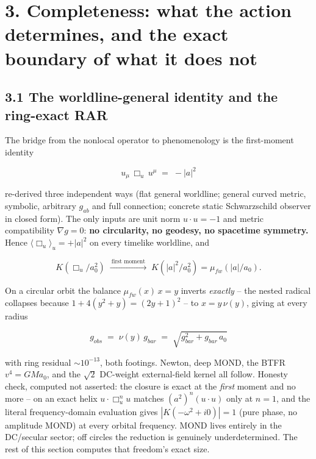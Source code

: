 \documentclass[
]{article}
\begin{document}
\section{3. Completeness: what the action determines, and the exact
boundary of what it does
not}\label{completeness-what-the-action-determines-and-the-exact-boundary-of-what-it-does-not}

\subsection{3.1 The worldline-general identity and the ring-exact
RAR}\label{the-worldline-general-identity-and-the-ring-exact-rar}

The bridge from the nonlocal operator to phenomenology is the
first-moment identity

\[ \boxed{\; u_\mu\, \Box_u\, u^\mu \;=\; -|a|^2 \;} \]

re-derived three independent ways (flat general worldline; general
curved metric, symbolic, arbitrary \(g_{ab}\) and full connection;
concrete static Schwarzschild observer in closed form). The only inputs
are unit norm \(u \cdot u = -1\) and metric compatibility
\(\nabla g = 0\): \textbf{no circularity, no geodesy, no spacetime
symmetry.} Hence \(\langle \Box_u \rangle_u = +|a|^2\) on every timelike
worldline, and

\[ K(\Box_u/a_0^2) \;\xrightarrow{\ \text{first moment}\ }\; K(|a|^2/a_0^2) = \mu_{fw}(|a|/a_0). \]

On a circular orbit the balance \(\mu_{fw}(x)\, x = y\) inverts
\emph{exactly} -- the nested radical collapses because
\(1 + 4(y^2+y) = (2y+1)^2\) -- to \(x = y\,\nu(y)\), giving at every
radius

\[ \boxed{\; g_{obs} \;=\; \nu(y)\, g_{bar} \;=\; \sqrt{g_{bar}^2 + g_{bar}\, a_0} \;} \]

with ring residual \(\sim 10^{-13}\), both footings. Newton, deep MOND,
the BTFR \(v^4 = G M a_0\), and the \(\sqrt2\) DC-weight external-field
kernel all follow. Honesty check, computed not asserted: the closure is
exact at the \emph{first} moment and no more -- on an exact helix
\(u \cdot \Box_u^n u\) matches \((a^2)^n (u \cdot u)\) only at
\(n = 1\), and the literal frequency-domain evaluation gives
\(|K(-\omega^2 + i0)| = 1\) (pure phase, no amplitude MOND) at every
orbital frequency. MOND lives entirely in the DC/secular sector; off
circles the reduction is genuinely underdetermined. The rest of this
section computes that freedom's exact size.
\end{document}
